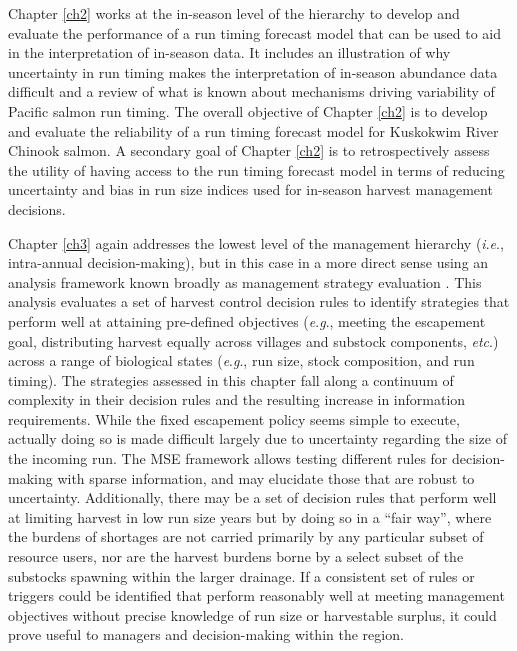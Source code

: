 \documentclass[12pt,]{book}
\theoremstyle{definition}
\theoremstyle{definition}
\theoremstyle{definition}
\theoremstyle{remark}
\begin{document}
Chapter \ref{ch2} works at the in-season level of the hierarchy to
develop and evaluate the performance of a run timing forecast model that
can be used to aid in the interpretation of in-season data. It includes
an illustration of why uncertainty in run timing makes the
interpretation of in-season abundance data difficult and a review of
what is known about mechanisms driving variability of Pacific salmon run
timing. The overall objective of Chapter \ref{ch2} is to develop and
evaluate the reliability of a run timing forecast model for Kuskokwim
River Chinook salmon. A secondary goal of Chapter \ref{ch2} is to
retrospectively assess the utility of having access to the run timing
forecast model in terms of reducing uncertainty and bias in run size
indices used for in-season harvest management decisions.

Chapter \ref{ch3} again addresses the lowest level of the management
hierarchy (\emph{i}.\emph{e}., intra-annual decision-making), but in
this case in a more direct sense using an analysis framework known
broadly as management strategy evaluation \citep[MSE;
\emph{e}.\emph{g}.,][]{butterworth-2007, punt-etal-2014}. This analysis
evaluates a set of harvest control decision rules to identify strategies
that perform well at attaining pre-defined objectives
(\emph{e}.\emph{g}., meeting the escapement goal, distributing harvest
equally across villages and substock components, \emph{etc}.) across a
range of biological states (\emph{e}.\emph{g}., run size, stock
composition, and run timing). The strategies assessed in this chapter
fall along a continuum of complexity in their decision rules and the
resulting increase in information requirements. While the fixed
escapement policy seems simple to execute, actually doing so is made
difficult largely due to uncertainty regarding the size of the incoming
run. The MSE framework allows testing different rules for
decision-making with sparse information, and may elucidate those that
are robust to uncertainty. Additionally, there may be a set of decision
rules that perform well at limiting harvest in low run size years but by
doing so in a ``fair way'', where the burdens of shortages are not
carried primarily by any particular subset of resource users, nor are
the harvest burdens borne by a select subset of the substocks spawning
within the larger drainage. If a consistent set of rules or triggers
could be identified that perform reasonably well at meeting management
objectives without precise knowledge of run size or harvestable surplus,
it could prove useful to managers and decision-making within the region.
\end{document}
